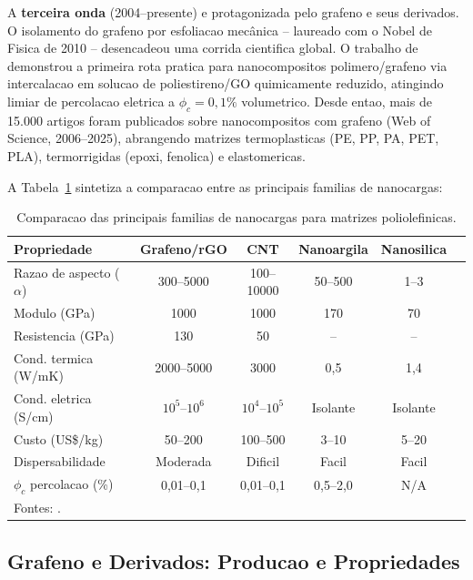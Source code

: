\documentclass[11pt,a4paper,oneside]{article}
\begin{document}
A {\bfseries terceira onda} (2004--presente) e protagonizada pelo grafeno e seus derivados. O isolamento do grafeno por esfoliacao mecânica \cite{Geim2007} -- laureado com o Nobel de Fisica de 2010 -- desencadeou uma corrida cientifica global. O trabalho de \citet{Stankovich2006} demonstrou a primeira rota pratica para nanocompositos polimero/grafeno via intercalacao em solucao de poliestireno/GO quimicamente reduzido, atingindo limiar de percolacao eletrica a $\phi_c{=}0{,}1\%$ volumetrico. Desde entao, mais de 15.000 artigos foram publicados sobre nanocompositos com grafeno (Web of Science, 2006--2025), abrangendo matrizes termoplasticas (PE, PP, PA, PET, PLA), termorrigidas (epoxi, fenolica) e elastomericas.

A Tabela~\ref{tab:nanocargas} sintetiza a comparacao entre as principais familias de nanocargas:

\begin{table}[H]\centering
\caption{Comparacao das principais familias de nanocargas para matrizes poliolefinicas.}\label{tab:nanocargas}
\begin{tabular}{lccccc}
\toprule
{\bfseries Propriedade} & {\bfseries Grafeno/rGO} & {\bfseries CNT} & {\bfseries Nanoargila} & {\bfseries Nanosilica} \\
\midrule
Razao de aspecto ($\alpha$) & 300--5000 & 100--10000 & 50--500 & 1--3 \\
Modulo (GPa) & 1000 & 1000 & 170 & 70 \\
Resistencia (GPa) & 130 & 50 & -- & -- \\
Cond. termica (W/mK) & 2000--5000 & 3000 & 0,5 & 1,4 \\
Cond. eletrica (S/cm) & $10^5$--$10^6$ & $10^4$--$10^5$ & Isolante & Isolante \\
Custo (US\$/kg) & 50--200 & 100--500 & 3--10 & 5--20 \\
Dispersabilidade & Moderada & Dificil & Facil & Facil \\
$\phi_c$ percolacao (\%) & 0,01--0,1 & 0,01--0,1 & 0,5--2,0 & N/A \\
\bottomrule
\multicolumn{5}{l}{\footnotesize Fontes: \cite{Kim2010, Potts2011, Young2012, Araby2020, Kumar2022}.}\\
\end{tabular}
\end{table}

\subsection{Grafeno e Derivados: Producao e Propriedades}
\end{document}
